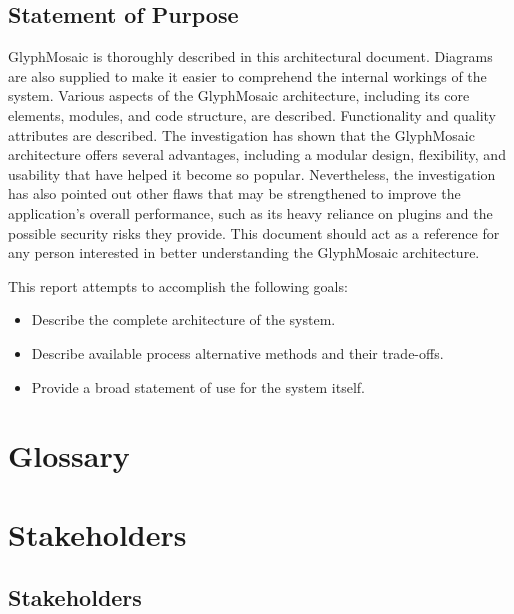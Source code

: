 \subsection{Statement of Purpose}
GlyphMosaic is thoroughly described in this architectural document.
Diagrams are also supplied to make it easier to comprehend the internal workings of the system.
Various aspects of the GlyphMosaic architecture,  including its core elements, modules, and code structure, are described.
Functionality and quality attributes are described.
The investigation has shown that the GlyphMosaic architecture offers several advantages, including a modular design, flexibility, and usability that have helped it become so popular.
Nevertheless, the investigation has also pointed out other flaws that may be strengthened to improve the application's overall performance, such as its heavy reliance on plugins and the possible security risks they provide.
This document should act as a reference for any person interested in better understanding the GlyphMosaic architecture.

This report attempts to accomplish the following goals:
\begin{itemize}
  \item Describe the complete architecture of the system.
  \item Describe available process alternative methods and their trade-offs.
  \item Provide a broad statement of use for the system itself.
\end{itemize}



\section{Glossary}
\begin{itemize}
\end{itemize}



\section{Stakeholders}
\subsection{Stakeholders}
\begin{itemize}
\end{itemize}
